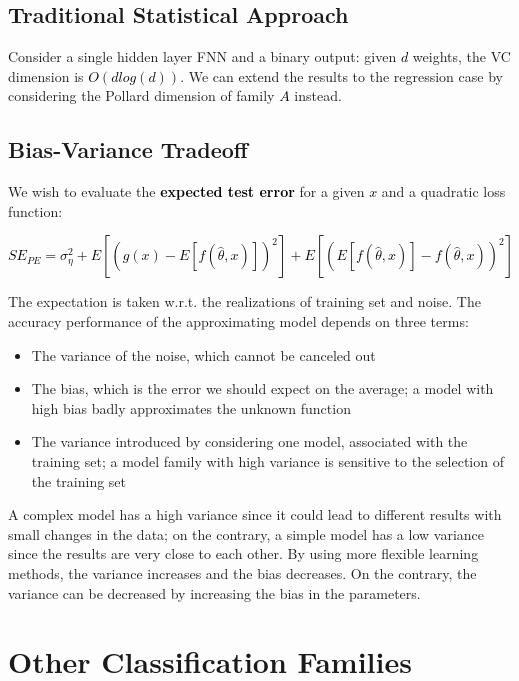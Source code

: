 \documentclass{article}
\newcommand{\bb}[1]{\textcolor{black}{\textbf{#1}}}
\newcommand{\rr}[1]{\textcolor{black}{#1}}
\newcommand{\cc}[1]{\begin{center}\textcolor{black}{#1}\end{center}}
\begin{document}
\subsection{Traditional Statistical Approach}
Consider a single hidden layer FNN and a binary output: given \rr{$d$} weights, the VC dimension is \rr{$O(d log(d))$}. We can extend the results to the regression case by considering the Pollard dimension of family \rr{$A$} instead.

\subsection{Bias-Variance Tradeoff}
We wish to evaluate the \bb{expected test error} for a given \rr{$x$} and a quadratic loss function:
\cc{$SE_{PE} = \sigma^2_\eta + E \left[(g(x) - E[f(\hat{\theta}, x)])^2\right]+E\left[(E[f(\hat{\theta}, x)] - f(\hat{\theta}, x))^2\right]$}
The expectation is taken w.r.t. the realizations of training set and noise. The accuracy performance of the approximating model depends on three terms:
\begin{itemize}
    \item The variance of the noise, which cannot be canceled out
    \item The bias, which is the error we should expect on the average; a model with high bias badly approximates the unknown function
    \item The variance introduced by considering one model, associated with the training set; a model family with high variance is sensitive to the selection of the training set
\end{itemize}
A complex model has a high variance since it could lead to different results with small changes in the data; on the contrary, a simple model has a low variance since the results are very close to each other. By using more flexible learning methods, the variance increases and the bias decreases. On the contrary, the variance can be decreased by increasing the bias in the parameters.

\newpage

\section{Other Classification Families}
\end{document}
